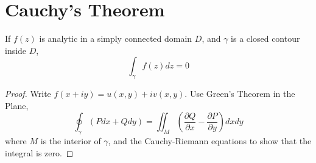 \documentclass[../Main.tex]{subfiles}
\begin{document}
\section{Cauchy's Theorem}
\begin{theorem}
    If $f(z)$ is analytic in a simply connected domain $D$, and $\gamma$ is a closed contour inside $D$,
    \begin{equation*}
        \int_\gamma f(z) dz = 0
    \end{equation*}
    \label{thmCauchy}
\end{theorem}
\begin{proof}
    Write $f(x + i y) = u(x, y) + iv(x, y)$. Use Green's Theorem in the Plane,
    \begin{equation*}
        \oint_{\gamma} (P dx + Q dy) =\iint_M \left(\frac{\partial Q}{\partial x} - \frac{\partial P}{\partial y}\right) dx dy
    \end{equation*}
    where $M$ is the interior of $\gamma$, and the Cauchy-Riemann equations to show that the integral is zero.
\end{proof}
\end{document}
